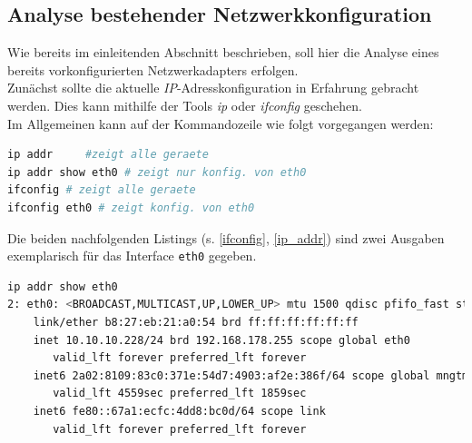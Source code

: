 \documentclass[paper=a4,fontsize=11pt]{scrartcl}%
\numberwithin{equation}{section}
\begin{document}
\subsection{Analyse bestehender Netzwerkkonfiguration}\label{conf_lan}
Wie bereits im einleitenden Abschnitt beschrieben, soll hier die Analyse eines bereits vorkonfigurierten Netzwerkadapters erfolgen.\\
Zunächst sollte die aktuelle \emph{IP}-Adresskonfiguration in Erfahrung gebracht werden. Dies kann mithilfe der Tools \emph{ip} oder \emph{ifconfig} geschehen.\\

Im Allgemeinen kann auf der Kommandozeile wie folgt vorgegangen werden:
\begin{lstlisting}[style=Bash, language=Bash]
ip addr 	#zeigt alle geraete
ip addr show eth0 # zeigt nur konfig. von eth0
ifconfig # zeigt alle geraete
ifconfig eth0 # zeigt konfig. von eth0
\end{lstlisting}
Die beiden nachfolgenden Listings (s. \ref{ifconfig}, \ref{ip_addr}) sind zwei Ausgaben exemplarisch für das Interface \texttt{eth0} gegeben.
\begin{lstlisting}[style=Bash, language=Bash, label=ip_addr]
ip addr show eth0 
2: eth0: <BROADCAST,MULTICAST,UP,LOWER_UP> mtu 1500 qdisc pfifo_fast state UP group default qlen 1000
    link/ether b8:27:eb:21:a0:54 brd ff:ff:ff:ff:ff:ff
    inet 10.10.10.228/24 brd 192.168.178.255 scope global eth0
       valid_lft forever preferred_lft forever
    inet6 2a02:8109:83c0:371e:54d7:4903:af2e:386f/64 scope global mngtmpaddr noprefixroute dynamic 
       valid_lft 4559sec preferred_lft 1859sec
    inet6 fe80::67a1:ecfc:4dd8:bc0d/64 scope link 
       valid_lft forever preferred_lft forever
\end{lstlisting}
\end{document}
